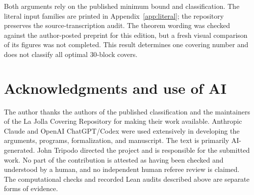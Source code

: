 \documentclass[11pt]{article}
\theoremstyle{definition}
\theoremstyle{remark}
\begin{document}
Both arguments rely on the published minimum bound and classification.
The literal input families are printed in Appendix~\ref{app:literal};
the repository preserves the source-transcription audit. The theorem
wording was checked against the author-posted preprint for this edition,
but a fresh visual comparison of its figures was not completed. This
result determines one covering number and does not classify all optimal
$30$-block covers.

\begingroup{}
\section*{Acknowledgments and use of AI}
The author thanks the authors of the published classification and the
maintainers of the La Jolla Covering Repository for making their work
available. Anthropic Claude and OpenAI ChatGPT/Codex were used extensively
in developing the arguments, programs, formalization, and manuscript.
The text is primarily AI-generated. John Tripodo directed the project
and is responsible for the submitted work. No part of the contribution
is attested as having been checked and understood by a human, and no
independent human referee review is claimed. The computational checks
and recorded Lean audits described above are separate forms of evidence.
\endgroup

\clearpage
\appendix
\end{document}
